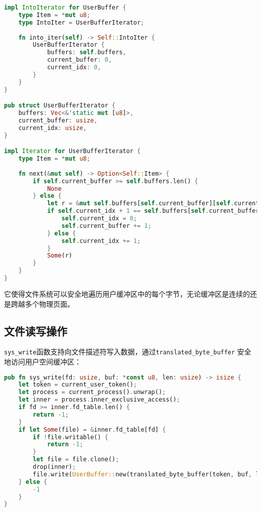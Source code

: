 \begin{lstlisting}[language=Rust,caption={UserBuffer迭代器实现}, label={lst:user-buffer-iter}]
impl IntoIterator for UserBuffer {
    type Item = *mut u8;
    type IntoIter = UserBufferIterator;
    
    fn into_iter(self) -> Self::IntoIter {
        UserBufferIterator {
            buffers: self.buffers,
            current_buffer: 0,
            current_idx: 0,
        }
    }
}

pub struct UserBufferIterator {
    buffers: Vec<&'static mut [u8]>,
    current_buffer: usize,
    current_idx: usize,
}

impl Iterator for UserBufferIterator {
    type Item = *mut u8;
    
    fn next(&mut self) -> Option<Self::Item> {
        if self.current_buffer >= self.buffers.len() {
            None
        } else {
            let r = &mut self.buffers[self.current_buffer][self.current_idx] as *mut _;
            if self.current_idx + 1 == self.buffers[self.current_buffer].len() {
                self.current_idx = 0;
                self.current_buffer += 1;
            } else {
                self.current_idx += 1;
            }
            Some(r)
        }
    }
}
\end{lstlisting}

它使得文件系统可以安全地遍历用户缓冲区中的每个字节，无论缓冲区是连续的还是跨越多个物理页面。

\subsection{文件读写操作}

\texttt{sys\_write}函数支持向文件描述符写入数据，通过\texttt{translated\_byte\_buffer}
安全地访问用户空间缓冲区：

\begin{lstlisting}[language=Rust,caption={文件写入系统调用}, label={lst:sys-write}]
pub fn sys_write(fd: usize, buf: *const u8, len: usize) -> isize {
    let token = current_user_token();
    let process = current_process().unwrap();
    let inner = process.inner_exclusive_access();
    if fd >= inner.fd_table.len() {
        return -1;
    }
    if let Some(file) = &inner.fd_table[fd] {
        if !file.writable() {
            return -1;
        }
        let file = file.clone();
        drop(inner);
        file.write(UserBuffer::new(translated_byte_buffer(token, buf, len))) as isize
    } else {
        -1
    }
}
\end{lstlisting}

